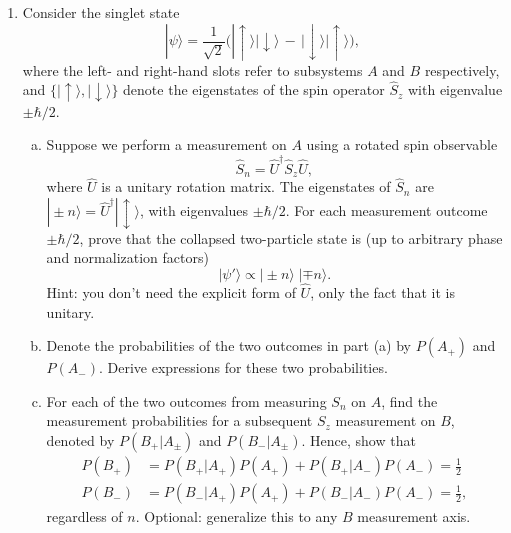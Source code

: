 \documentclass[prx,12pt]{revtex4-2}
\begin{document}
\begin{enumerate}

\item \label{ex:singletproperties}
Consider the singlet state
\begin{equation}
  |\psi\rangle = \frac{1}{\sqrt{2}} \Big(|\!\uparrow\rangle|\!\downarrow\rangle \,-\, |\!\downarrow\rangle|\!\uparrow\rangle\Big),
\end{equation}
where the left- and right-hand slots refer to subsystems $A$ and $B$
respectively, and $\{|\!\uparrow\rangle, |\!\downarrow\rangle\}$
denote the eigenstates of the spin operator $\hat{S}_z$ with
eigenvalue $\pm\hbar/2$.
\begin{enumerate}[(a)]
\item Suppose we perform a measurement on $A$ using a rotated spin
  observable
\begin{equation}
  \hat{S}_n = \hat{U}^\dagger \hat{S}_z \hat{U},
\end{equation}
where $\hat{U}$ is a unitary rotation matrix.  The eigenstates of
$\hat{S}_n$ are $|\!\pm n\rangle = \hat{U}^\dagger |\!\updownarrow\rangle$, with
eigenvalues $\pm \hbar/2$.  For each measurement outcome $\pm\hbar/2$,
prove that the collapsed two-particle state is (up to arbitrary phase
and normalization factors)
\begin{equation}
  |\psi'\rangle \propto |\pm \!n \rangle\; |\mp\! n\rangle.
\end{equation}
Hint: you don't need the explicit form of $\hat{U}$, only the fact
that it is unitary.

\item Denote the probabilities of the two outcomes in part (a) by
  $P(A_+)$ and $P(A_-)$.  Derive expressions for these two
  probabilities.

\item For each of the two outcomes from measuring $S_n$ on $A$, find
  the measurement probabilities for a subsequent $S_z$ measurement on
  $B$, denoted by $P(B_+|A_\pm)$ and $P(B_-|A_\pm)$.  Hence, show that
  \begin{align}
    P(B_+) &= P(B_+|A_+) P(A_+) + P(B_+|A_-) P(A_-) = \frac{1}{2}\\
    P(B_-) &= P(B_-|A_+) P(A_+) + P(B_-|A_-) P(A_-) = \frac{1}{2},
  \end{align}
  regardless of $n$.  Optional: generalize this to any $B$ measurement
  axis.

\end{enumerate}



\end{enumerate}
\end{document}
